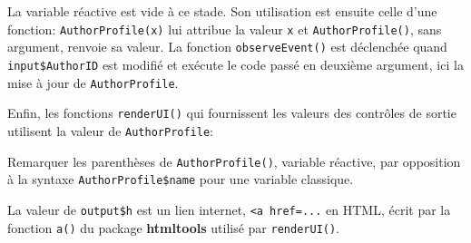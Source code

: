 \documentclass[
  12pt,
  french,
  a4paper,
  extrafontsizes,onecolumn,openright
  ]{memoir}
\newenvironment{Shaded}{\begin{snugshade}}{\end{snugshade}}
\newcommand{\CommentTok}[1]{\textcolor[rgb]{0.56,0.35,0.01}{\textit{#1}}}
\newcommand{\DataTypeTok}[1]{\textcolor[rgb]{0.13,0.29,0.53}{#1}}
\newcommand{\KeywordTok}[1]{\textcolor[rgb]{0.13,0.29,0.53}{\textbf{#1}}}
\newcommand{\NormalTok}[1]{#1}
\newcommand{\OperatorTok}[1]{\textcolor[rgb]{0.81,0.36,0.00}{\textbf{#1}}}
\newcommand{\StringTok}[1]{\textcolor[rgb]{0.31,0.60,0.02}{#1}}
\begin{document}
\normalsize

La variable réactive est vide à ce stade.
Son utilisation est ensuite celle d'une fonction: \texttt{AuthorProfile(x)} lui attribue la valeur \texttt{x} et \texttt{AuthorProfile()}, sans argument, renvoie sa valeur.
La fonction \texttt{observeEvent()} est déclenchée quand \texttt{input\$AuthorID} est modifié et exécute le code passé en deuxième argument, ici la mise à jour de \texttt{AuthorProfile}.

\scriptsize

\begin{Shaded}
\end{Shaded}

\normalsize

Enfin, les fonctions \texttt{renderUI()} qui fournissent les valeurs des contrôles de sortie utilisent la valeur de \texttt{AuthorProfile}:

\scriptsize

\begin{Shaded}
\end{Shaded}

\normalsize

Remarquer les parenthèses de \texttt{AuthorProfile()}, variable réactive, par opposition à la syntaxe \texttt{AuthorProfile\$name} pour une variable classique.

La valeur de \texttt{output\$h} est un lien internet, \texttt{\textless{}a\ href=...} en HTML, écrit par la fonction \texttt{a()} du package \textbf{htmltools} utilisé par \texttt{renderUI()}.

\scriptsize

\begin{Shaded}
\end{Shaded}
\end{document}
